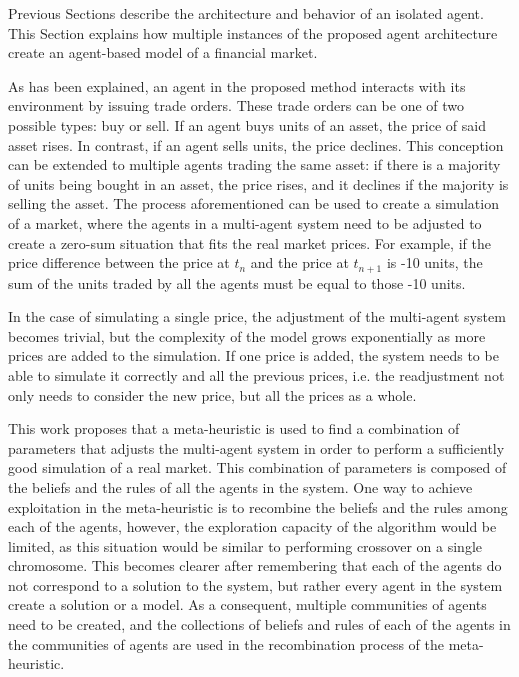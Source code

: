 Previous Sections describe the architecture and behavior of an isolated
agent. This Section explains how multiple instances of the proposed agent
architecture create an agent-based model of a financial market.

As has been explained, an agent in the proposed method interacts with its
environment by issuing trade orders. These trade orders can be one of two
possible types: buy or sell. If an agent buys units of an asset, the price of
said asset rises. In contrast, if an agent sells units, the price declines. This
conception can be extended to multiple agents trading the same asset: if there
is a majority of units being bought in an asset, the price rises, and it
declines if the majority is selling the asset. The process aforementioned can be
used to create a simulation of a market, where the agents in a multi-agent
system need to be adjusted to create a zero-sum situation that fits the real
market prices. For example, if the price difference between the price at $t_n$
and the price at $t_{n+1}$ is -10 units, the sum of the units traded by all the
agents must be equal to those -10 units.

In the case of simulating a single price, the adjustment of the multi-agent
system becomes trivial, but the complexity of the model grows exponentially as
more prices are added to the simulation. If one price is added, the system needs
to be able to simulate it correctly and all the previous prices, i.e. the
readjustment not only needs to consider the new price, but all the prices as a
whole.

This work proposes that a meta-heuristic is used to find a combination of
parameters that adjusts the multi-agent system in order to perform a
sufficiently good simulation of a real market. This combination of parameters is
composed of the beliefs and the rules of all the agents in the system. One way
to achieve exploitation in the meta-heuristic is to recombine the beliefs and
the rules among each of the agents, however, the exploration capacity of the
algorithm would be limited, as this situation would be similar to performing
crossover on a single chromosome. This becomes clearer after remembering that
each of the agents do not correspond to a solution to the system, but rather
every agent in the system create a solution or a model. As a consequent,
multiple communities of agents need to be created, and the collections of
beliefs and rules of each of the agents in the communities of agents are used in
the recombination process of the meta-heuristic.

